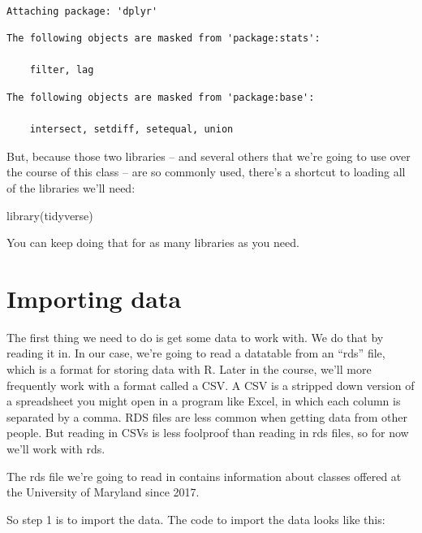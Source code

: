 \documentclass[
  letterpaper,
  DIV=11,
  numbers=noendperiod]{scrreprt}
\newenvironment{Shaded}{\begin{snugshade}}{\end{snugshade}}
\newcommand{\FunctionTok}[1]{\textcolor[rgb]{0.28,0.35,0.67}{#1}}
\newcommand{\NormalTok}[1]{\textcolor[rgb]{0.00,0.23,0.31}{#1}}
\begin{document}
\begin{verbatim}

Attaching package: 'dplyr'
\end{verbatim}

\begin{verbatim}
The following objects are masked from 'package:stats':

    filter, lag
\end{verbatim}

\begin{verbatim}
The following objects are masked from 'package:base':

    intersect, setdiff, setequal, union
\end{verbatim}

But, because those two libraries -- and several others that we're going
to use over the course of this class -- are so commonly used, there's a
shortcut to loading all of the libraries we'll need:

\begin{Shaded}
\begin{Highlighting}[]
\FunctionTok{library}\NormalTok{(tidyverse)}
\end{Highlighting}
\end{Shaded}

You can keep doing that for as many libraries as you need.

\hypertarget{importing-data}{%
\section{Importing data}\label{importing-data}}

The first thing we need to do is get some data to work with. We do that
by reading it in. In our case, we're going to read a datatable from an
``rds'' file, which is a format for storing data with R. Later in the
course, we'll more frequently work with a format called a CSV. A CSV is
a stripped down version of a spreadsheet you might open in a program
like Excel, in which each column is separated by a comma. RDS files are
less common when getting data from other people. But reading in CSVs is
less foolproof than reading in rds files, so for now we'll work with
rds.

The rds file we're going to read in contains information about classes
offered at the University of Maryland since 2017.

So step 1 is to import the data. The code to import the data looks like
this:
\end{document}
